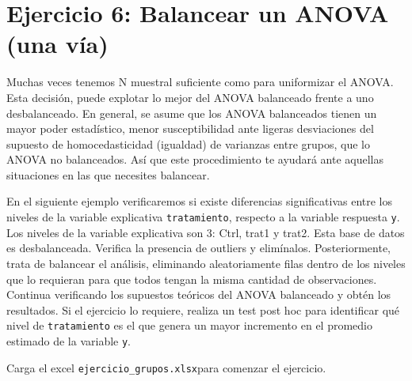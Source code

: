 \documentclass[
]{article}
\newenvironment{Shaded}{}{}
\newcommand{\CommentTok}[1]{\textcolor[rgb]{0.38,0.63,0.69}{\textit{#1}}}
\newcommand{\FunctionTok}[1]{\textcolor[rgb]{0.02,0.16,0.49}{#1}}
\newcommand{\NormalTok}[1]{#1}
\newcommand{\OtherTok}[1]{\textcolor[rgb]{0.00,0.44,0.13}{#1}}
\newcommand{\SpecialCharTok}[1]{\textcolor[rgb]{0.25,0.44,0.63}{#1}}
\newcommand{\StringTok}[1]{\textcolor[rgb]{0.25,0.44,0.63}{#1}}
\begin{document}
\hypertarget{ejercicio-6-balancear-un-anova-una-vuxeda}{%
\section{\texorpdfstring{\textbf{Ejercicio 6: Balancear un ANOVA (una
vía)}}{Ejercicio 6: Balancear un ANOVA (una vía)}}\label{ejercicio-6-balancear-un-anova-una-vuxeda}}

Muchas veces tenemos N muestral suficiente como para uniformizar el
ANOVA. Esta decisión, puede explotar lo mejor del ANOVA balanceado
frente a uno desbalanceado. En general, se asume que los ANOVA
balanceados tienen un mayor poder estadístico, menor susceptibilidad
ante ligeras desviaciones del supuesto de homocedasticidad (igualdad) de
varianzas entre grupos, que lo ANOVA no balanceados. Así que este
procedimiento te ayudará ante aquellas situaciones en las que necesites
balancear.

En el siguiente ejemplo verificaremos si existe diferencias
significativas entre los niveles de la variable explicativa
\texttt{tratamiento}, respecto a la variable respuesta \texttt{y}. Los
niveles de la variable explicativa son 3: Ctrl, trat1 y trat2. Esta base
de datos es desbalanceada. Verifica la presencia de outliers y
elimínalos. Posteriormente, trata de balancear el análisis, eliminando
aleatoriamente filas dentro de los niveles que lo requieran para que
todos tengan la misma cantidad de observaciones. Continua verificando
los supuestos teóricos del ANOVA balanceado y obtén los resultados. Si
el ejercicio lo requiere, realiza un test post hoc para identificar qué
nivel de \texttt{tratamiento} es el que genera un mayor incremento en el
promedio estimado de la variable \texttt{y}.

Carga el excel \texttt{ejercicio\_grupos.xlsx}para comenzar el
ejercicio.

\begin{Shaded}
\end{Shaded}
\end{document}
